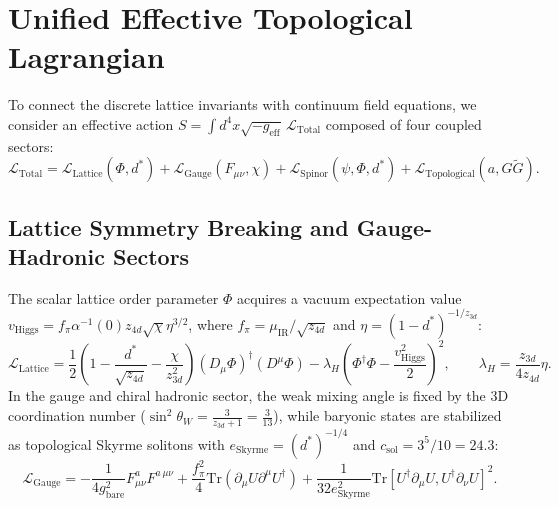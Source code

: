 \documentclass[11pt,a4paper]{article}
\begin{document}
\section{Unified Effective Topological Lagrangian}

To connect the discrete lattice invariants with continuum field equations, we consider an effective action $S = \int d^4x \sqrt{-g_{\mathrm{eff}}}\,\mathcal{L}_{\mathrm{Total}}$ composed of four coupled sectors:
\begin{equation}
    \mathcal{L}_{\mathrm{Total}} = \mathcal{L}_{\mathrm{Lattice}}(\Phi, d^*) + \mathcal{L}_{\mathrm{Gauge}}(F_{\mu\nu}, \chi) + \mathcal{L}_{\mathrm{Spinor}}(\psi, \Phi, d^*) + \mathcal{L}_{\mathrm{Topological}}(a, G\tilde{G}).
\end{equation}

\subsection{Lattice Symmetry Breaking and Gauge-Hadronic Sectors}
The scalar lattice order parameter $\Phi$ acquires a vacuum expectation value $v_{\mathrm{Higgs}} = f_\pi \alpha^{-1}(0) z_{4d} \sqrt{\chi} \eta^{3/2}$, where $f_\pi = \mu_{\mathrm{IR}}/\sqrt{z_{4d}}$ and $\eta = (1 - d^*)^{-1/z_{3d}}$:
\begin{equation}
    \mathcal{L}_{\mathrm{Lattice}} = \frac{1}{2}\left(1 - \frac{d^*}{\sqrt{z_{4d}}} - \frac{\chi}{z_{3d}^2}\right)(D_\mu \Phi)^\dagger (D^\mu \Phi) - \lambda_H \left(\Phi^\dagger \Phi - \frac{v_{\mathrm{Higgs}}^2}{2}\right)^2, \qquad \lambda_H = \frac{z_{3d}}{4 z_{4d}}\eta.
\end{equation}
In the gauge and chiral hadronic sector, the weak mixing angle is fixed by the 3D coordination number ($\sin^2\theta_W = \frac{3}{z_{3d}+1} = \frac{3}{13}$), while baryonic states are stabilized as topological Skyrme solitons with $e_{\mathrm{Skyrme}} = (d^*)^{-1/4}$ and $c_{\mathrm{sol}} = 3^5/10 = 24.3$:
\begin{equation}
    \mathcal{L}_{\mathrm{Gauge}} = -\frac{1}{4 g_{\mathrm{bare}}^2} F_{\mu\nu}^a F^{a\,\mu\nu} + \frac{f_\pi^2}{4}\mathrm{Tr}(\partial_\mu U \partial^\mu U^\dagger) + \frac{1}{32 e_{\mathrm{Skyrme}}^2}\mathrm{Tr}[U^\dagger \partial_\mu U, U^\dagger \partial_\nu U]^2.
\end{equation}
\end{document}
